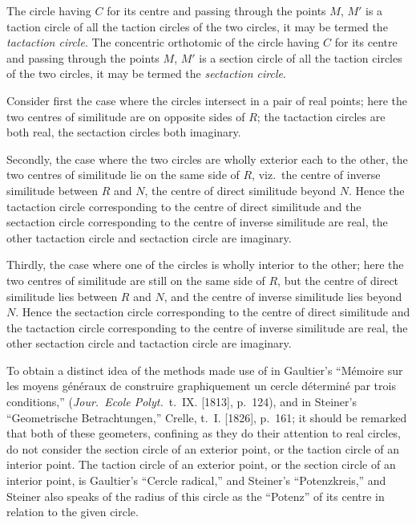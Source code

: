 \documentclass[12pt,a4paper]{article}
\theoremstyle{plain}
\theoremstyle{definition}
\begin{document}
The circle having $C$ for its centre and passing through the points $M$, $M'$ is a taction circle of all the taction circles of the two circles, it may be termed the \textit{tactaction circle}. The concentric orthotomic of the circle having $C$ for its centre and passing through the points $M$, $M'$ is a section circle of all the taction circles of the two circles, it may be termed the \textit{sectaction circle}.

Consider first the case where the circles intersect in a pair of real points; here the two centres of similitude are on opposite sides of $R$; the tactaction circles are both real, the sectaction circles both imaginary.

Secondly, the case where the two circles are wholly exterior each to the other, the two centres of similitude lie on the same side of $R$, viz.\ the centre of inverse similitude between $R$ and $N$, the centre of direct similitude beyond $N$. Hence the tactaction circle corresponding to the centre of direct similitude and the sectaction circle corresponding to the centre of inverse similitude are real, the other tactaction circle and sectaction circle are imaginary.

Thirdly, the case where one of the circles is wholly interior to the other; here the two centres of similitude are still on the same side of $R$, but the centre of direct similitude lies between $R$ and $N$, and the centre of inverse similitude lies beyond $N$. Hence the sectaction circle corresponding to the centre of direct similitude and the tactaction circle corresponding to the centre of inverse similitude are real, the other sectaction circle and tactaction circle are imaginary.

\newpage
[183]

To obtain a distinct idea of the methods made use of in Gaultier's ``M\'{e}moire sur les moyens g\'{e}n\'{e}raux de construire graphiquement un cercle d\'{e}termin\'{e} par trois conditions,'' (\textit{Jour.\ Ecole Polyt.}\ t.~IX. [1813], p.~124), and in Steiner's ``Geometrische Betrachtungen,'' Crelle, t.~I. [1826], p.~161; it should be remarked that both of these geometers, confining as they do their attention to real circles, do not consider the section circle of an exterior point, or the taction circle of an interior point. The taction circle of an exterior point, or the section circle of an interior point, is Gaultier's ``Cercle radical,'' and Steiner's ``Potenzkreis,'' and Steiner also speaks of the radius of this circle as the ``Potenz'' of its centre in relation to the given circle.
\end{document}
